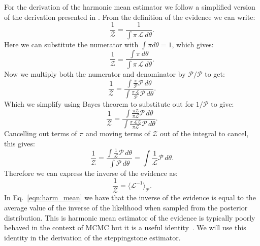 For the derivation of the harmonic mean estimator we follow a simplified version of the derivation presented in \citep{newton1994approximate}. From the definition of the evidence we can write:
\begin{equation}
    \frac{1}{\mathcal{Z}} = \frac{1}{\int \pi \, \mathcal{L} \, d\theta}.
\end{equation}
Here we can substitute the numerator with $\int \pi d\theta = 1$, which gives:
\begin{equation}
    \frac{1}{\mathcal{Z}} = \frac{\int \pi \, d\theta}{\int \pi \, \mathcal{L} \, d\theta}.
\end{equation}
Now we multiply both the numerator and denominator by $\mathcal{P}/\mathcal{P}$ to get:
\begin{equation}
    \frac{1}{\mathcal{Z}} = \frac{\int \frac{\pi}{\mathcal{P}} \mathcal{P} \, d\theta}{\int \frac{\pi \, \mathcal{L}}{\mathcal{P}}\mathcal{P} \, d\theta}.
\end{equation}
Which we simplify using Bayes theorem to substitute out for $1/\mathcal{P}$ to give:
\begin{equation}
    \frac{1}{\mathcal{Z}} = \frac{\int \frac{\pi \mathcal{Z}}{\pi \mathcal{L}} \mathcal{P} \, d\theta}{\int \frac{\pi \, \mathcal{L} \mathcal{Z}}{\pi \mathcal{L}}\mathcal{P} \, d\theta}.
\end{equation}
Cancelling out terms of $\pi$ and moving terms of $\mathcal{Z}$ out of the integral to cancel, this gives:
\begin{equation}
    \frac{1}{\mathcal{Z}} = \frac{\int \frac{1}{\mathcal{L}} \mathcal{P} \, d\theta}{\int \mathcal{P} \, d\theta} = \int \frac{1}{\mathcal{L}} \mathcal{P} \, d\theta.
\end{equation}
Therefore we can express the inverse of the evidence as:
\begin{equation}\label{eqn:harm_mean}
    \frac{1}{\mathcal{Z}} = \langle \mathcal{L}^{-1} \rangle_{\mathcal{P}}.
\end{equation}
In Eq.~\ref{eqn:harm_mean} we have that the inverse of the evidence is equal to the average value of the inverse of the likelihood when sampled from the posterior distribution. This is harmonic mean estimator of the evidence is typically poorly behaved in the context of MCMC but it is a useful identity~\cite{xie2010improving}. We will use this identity in the derivation of the steppingstone estimator.

